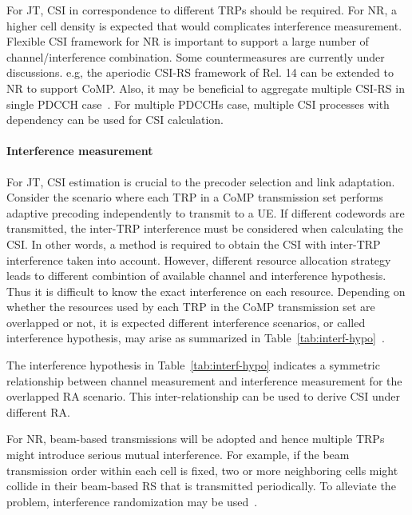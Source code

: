 \documentclass[a4paper,12pt]{article}%
\begin{document}
For JT, CSI in correspondence to different TRPs should be required. For NR, a higher cell density is expected that would complicates interference measurement. Flexible CSI framework for NR is important to support a large number of channel/interference combination. Some countermeasures are currently under discussions. e.g, the aperiodic CSI-RS framework of Rel. 14 can be extended to NR to support CoMP. Also, it may be beneficial to aggregate multiple CSI-RS in single PDCCH case~\cite{R1-1710180}. For multiple PDCCHs case, multiple CSI processes with dependency can be used for CSI calculation.

\paragraph{Interference measurement}

For JT, CSI estimation is crucial to the precoder selection and link adaptation. Consider the scenario where each TRP in a CoMP transmission set performs adaptive precoding independently to transmit to a UE. If different codewords are transmitted, the inter-TRP interference must be considered when calculating the CSI. In other words, a method is required to obtain the CSI with inter-TRP interference taken into account. However, different resource allocation strategy leads to different combintion of available channel and interference hypothesis. Thus it is difficult to know the exact interference on each resource. Depending on whether the resources used by each TRP in the CoMP transmission set are overlapped or not, it is expected different interference scenarios, or called interference hypothesis, may arise as summarized in Table~\ref{tab:interf-hypo}~\cite{R1-1710451}.

The interference hypothesis in Table~\ref{tab:interf-hypo} indicates a symmetric relationship between channel measurement and interference measurement for the overlapped RA scenario. This inter-relationship can be used to derive CSI under different RA.


For NR, beam-based transmissions will be adopted and hence multiple TRPs might introduce serious mutual interference. For example, if the beam transmission order within each cell is fixed, two or more neighboring cells might collide in their beam-based RS that is transmitted periodically. To alleviate the problem, interference randomization may be used~\cite{R1-1710180}.
\end{document}
